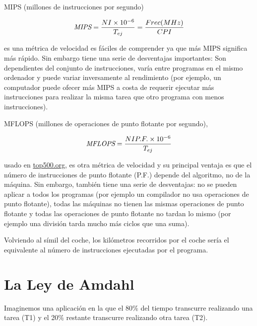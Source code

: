 \documentclass[12pt,onecolumn]{memoir}
\begin{document}
MIPS (millones de instrucciones por segundo)

\[ \emph{MIPS} = \frac{NI \times 10^{-6}}{T_{ej}} = \frac{Frec (MHz)}{CPI} \]

es una métrica de
velocidad es fáciles de comprender ya que más MIPS significa más
rápido. Sin embargo tiene una serie de desventajas importantes: Son
dependientes del conjunto de instrucciones, varía entre programas en
el mismo ordenador y puede variar inversamente al rendimiento (por
ejemplo, un computador puede ofecer más MIPS a costa de requerir ejecutar más
instrucciones para realizar la misma tarea que otro programa con menos
instrucciones).

MFLOPS (millones de operaciones de punto flotante por segundo),

\[ \emph{MFLOPS} = \frac{NI P.F. \times 10^{-6}}{T_{ej}} \]

usado
en \url{top500.org}, es otra métrica de velocidad y su principal
ventaja es que el número de instrucciones de punto flotante (P.F.)
depende del algoritmo, no de la máquina. Sin embargo, también tiene una serie
de desventajas: no se pueden aplicar a todos los programas (por
ejemplo un compilador no usa operaciones de punto flotante), todas las
máquinas no tienen las mismas operaciones de punto flotante y todas
las operaciones de punto flotante no tardan lo mismo (por ejemplo una
división tarda mucho más ciclos que una suma).

Volviendo al símil del coche, los kilómetros recorridos por el coche sería el
equivalente al número de instrucciones ejecutadas por el programa.

\section{La Ley de Amdahl}

Imaginemos una aplicación en la que el 80\% del tiempo transcurre
realizando una tarea (T1) y el 20\% restante transcurre realizando otra
tarea (T2).

\begin{center}
\end{center}
\end{document}

